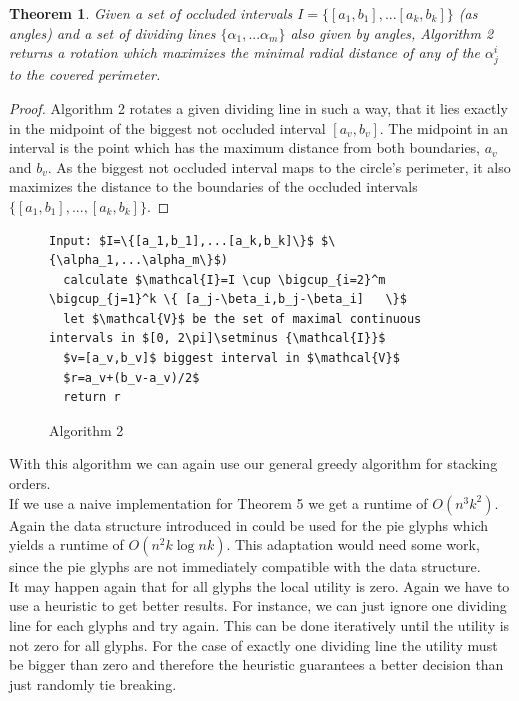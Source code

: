 \documentclass[a4paper,11pt]{article}
\newtheorem{theorem}{Theorem}
\begin{document}
\begin{theorem}
  Given a set of occluded intervals $I=\{[a_1,b_1],...[a_k,b_k]\}$ (as angles) and a set of dividing lines $\{\alpha_1,...\alpha_m\}$ also given by angles, Algorithm 2 returns a rotation which maximizes the minimal radial distance of any of the $\alpha^i_j$ to the covered perimeter.
\end{theorem}

\begin{proof}
  Algorithm 2 rotates a given dividing line in such a way, that it lies exactly in the midpoint of the biggest not occluded interval $[a_v, b_v]$. The midpoint in an interval is the point which has the maximum distance from both boundaries, $a_v$ and $b_v$. As the biggest not occluded interval maps to the circle's perimeter, it also maximizes the distance to the boundaries of the occluded intervals $\{[a_1, b_1], ..., [a_k, b_k]\}$.
\end{proof}

\begin{figure}[!bth]
  \begin{lstlisting}[mathescape=true ]
Input: $I=\{[a_1,b_1],...[a_k,b_k]\}$ $\{\alpha_1,...\alpha_m\}$)
  calculate $\mathcal{I}=I \cup \bigcup_{i=2}^m    \bigcup_{j=1}^k \{ [a_j-\beta_i,b_j-\beta_i]   \}$
  let $\mathcal{V}$ be the set of maximal continuous intervals in $[0, 2\pi]\setminus {\mathcal{I}}$
  $v=[a_v,b_v]$ biggest interval in $\mathcal{V}$
  $r=a_v+(b_v-a_v)/2$
  return r
  \end{lstlisting}
  \caption{Algorithm 2}
\end{figure}

With this algorithm we can again use our general greedy algorithm for stacking orders.\\

If we use a naive implementation for Theorem 5 we get a runtime of $O(n^3k^2)$. Again the data structure introduced in \cite{caballo} could be used for the pie glyphs which yields a runtime of $O(n^2k \log nk)$. This adaptation would need some work, since the pie glyphs are not immediately  compatible with the data structure.\\


It may happen again that for all glyphs the local utility is zero. Again we have to use a heuristic to get better results. For instance, we can just ignore one dividing line for each glyphs and try again. This can be done iteratively until the utility is not zero for all glyphs. For the case of exactly one dividing line the utility must be bigger than zero and therefore the heuristic guarantees a better decision than just randomly tie breaking.
\end{document}
